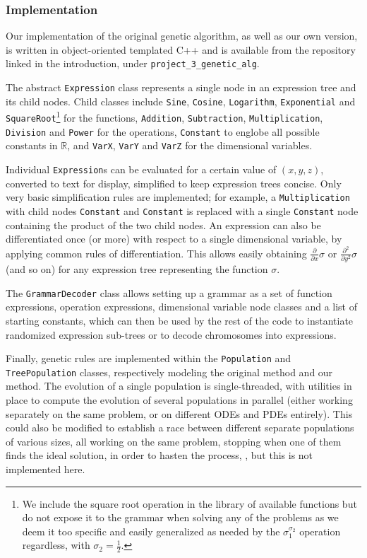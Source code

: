 \documentclass[aps,reprint,superscriptaddress,nofootinbib]{revtex4-2}
\begin{document}
\subsubsection{Implementation}

Our implementation of the original genetic algorithm, as well as our own version, is written in object-oriented templated C++ and is available from the repository linked in the introduction, under \texttt{project\_3\_genetic\_alg}.

The abstract \texttt{Expression} class represents a single node in an expression tree and its child nodes. Child classes include \texttt{Sine}, \texttt{Cosine}, \texttt{Logarithm}, \texttt{Exponential} and \texttt{SquareRoot}\footnote{We include the square root operation in the library of available functions but do not expose it to the grammar when solving any of the problems as we deem it too specific and easily generalized as needed by the \(\sigma_1^{\sigma_2}\) operation regardless, with \(\sigma_2 = \frac{1}{2}\).} for the functions, \texttt{Addition}, \texttt{Subtraction}, \texttt{Multiplication}, \texttt{Division} and \texttt{Power} for the operations, \texttt{Constant} to englobe all possible constants in \(\mathbb{R}\), and \texttt{VarX}, \texttt{VarY} and \texttt{VarZ} for the dimensional variables.

Individual \texttt{Expression}s can be evaluated for a certain value of \((x, y, z)\), converted to text for display, simplified to keep expression trees concise. Only very basic simplification rules are implemented; for example, a \texttt{Multiplication} with child nodes \texttt{Constant} and \texttt{Constant} is replaced with a single \texttt{Constant} node containing the product of the two child nodes. An expression can also be differentiated once (or more) with respect to a single dimensional variable, by applying common rules of differentiation. This allows easily obtaining \(\frac{\partial}{\partial x}\sigma\) or \(\frac{\partial^2}{\partial y^2}\sigma\) (and so on) for any expression tree representing the function \(\sigma\).

The \texttt{GrammarDecoder} class allows setting up a grammar as a set of function expressions, operation expressions, dimensional variable node classes and a list of starting constants, which can then be used by the rest of the code to instantiate randomized expression sub-trees or to decode chromosomes into expressions.

Finally, genetic rules are implemented within the \texttt{Population} and \texttt{TreePopulation} classes, respectively modeling the original method and our method. The evolution of a single population is single-threaded, with utilities in place to compute the evolution of several populations in parallel (either working separately on the same problem, or on different ODEs and PDEs entirely). This could also be modified to establish a race between different separate populations of various sizes, all working on the same problem, stopping when one of them finds the ideal solution, in order to hasten the process, \cite{parameterless_ga}, but this is not implemented here.
\end{document}
